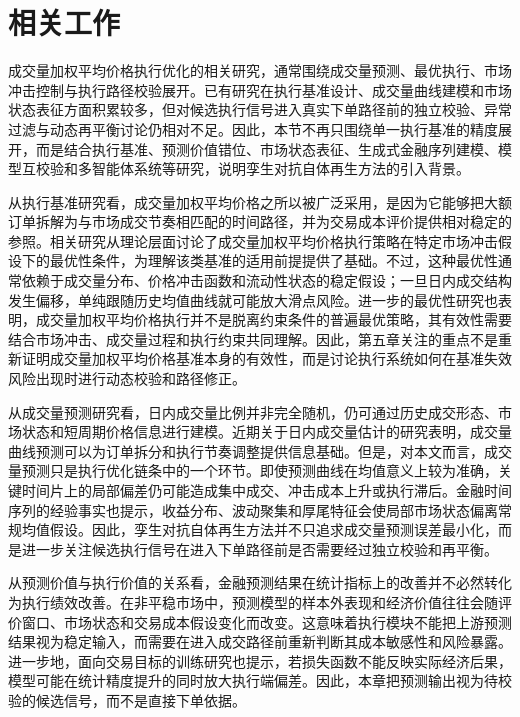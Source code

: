 \section{相关工作}

成交量加权平均价格执行优化的相关研究，通常围绕成交量预测、最优执行、市场冲击控制与执行路径校验展开。已有研究在执行基准设计、成交量曲线建模和市场状态表征方面积累较多，但对候选执行信号进入真实下单路径前的独立校验、异常过滤与动态再平衡讨论仍相对不足。因此，本节不再只围绕单一执行基准的精度展开，而是结合执行基准、预测价值错位、市场状态表征、生成式金融序列建模、模型互校验和多智能体系统等研究，说明孪生对抗自体再生方法的引入背景。

从执行基准研究看，成交量加权平均价格之所以被广泛采用，是因为它能够把大额订单拆解为与市场成交节奏相匹配的时间路径，并为交易成本评价提供相对稳定的参照。相关研究从理论层面讨论了成交量加权平均价格执行策略在特定市场冲击假设下的最优性条件，为理解该类基准的适用前提提供了基础\cite{kato2014vwap}。不过，这种最优性通常依赖于成交量分布、价格冲击函数和流动性状态的稳定假设；一旦日内成交结构发生偏移，单纯跟随历史均值曲线就可能放大滑点风险。进一步的最优性研究也表明，成交量加权平均价格执行并不是脱离约束条件的普遍最优策略，其有效性需要结合市场冲击、成交量过程和执行约束共同理解\cite{kato2016optimality}。因此，第五章关注的重点不是重新证明成交量加权平均价格基准本身的有效性，而是讨论执行系统如何在基准失效风险出现时进行动态校验和路径修正。

从成交量预测研究看，日内成交量比例并非完全随机，仍可通过历史成交形态、市场状态和短周期价格信息进行建模。近期关于日内成交量估计的研究表明，成交量曲线预测可以为订单拆分和执行节奏调整提供信息基础\cite{lee2024ive}。但是，对本文而言，成交量预测只是执行优化链条中的一个环节。即使预测曲线在均值意义上较为准确，关键时间片上的局部偏差仍可能造成集中成交、冲击成本上升或执行滞后。金融时间序列的经验事实也提示，收益分布、波动聚集和厚尾特征会使局部市场状态偏离常规均值假设\cite{Cont2001Empirical}。因此，孪生对抗自体再生方法并不只追求成交量预测误差最小化，而是进一步关注候选执行信号在进入下单路径前是否需要经过独立校验和再平衡。

从预测价值与执行价值的关系看，金融预测结果在统计指标上的改善并不必然转化为执行绩效改善。在非平稳市场中，预测模型的样本外表现和经济价值往往会随评价窗口、市场状态和交易成本假设变化而改变\cite{rossi2021forecasting}。这意味着执行模块不能把上游预测结果视为稳定输入，而需要在进入成交路径前重新判断其成本敏感性和风险暴露。进一步地，面向交易目标的训练研究也提示，若损失函数不能反映实际经济后果，模型可能在统计精度提升的同时放大执行端偏差\cite{zhou2024two}。因此，本章把预测输出视为待校验的候选信号，而不是直接下单依据。

